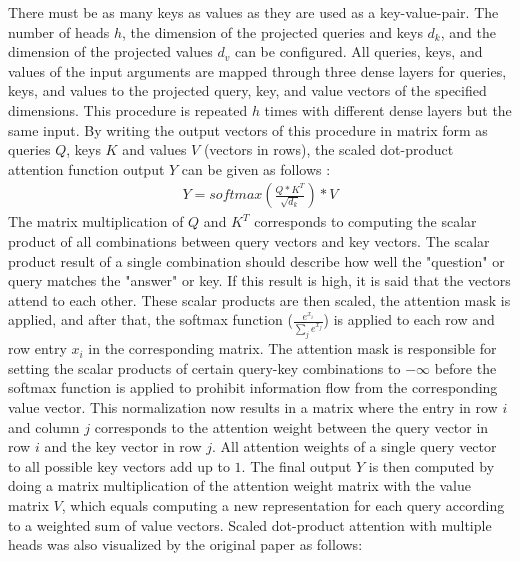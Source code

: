 \documentclass[draft,final]{vutinfth} %
\begin{document}
    There must be as many keys as values as they are used as a key-value-pair.
    The number of heads $h$, the dimension of the projected queries and keys $d_k$, and the dimension of the projected values $d_v$ can be configured.
    All queries, keys, and values of the input arguments are mapped through three dense layers for queries, keys, and values to the projected query, key, and value vectors of the specified dimensions.
    This procedure is repeated $h$ times with different dense layers but the same input.
    By writing the output vectors of this procedure in matrix form as queries $Q$, keys $K$ and values $V$ (vectors in rows), the scaled dot-product attention function output $Y$ can be given as follows \cite[p. 4]{Transformer}:
    \begin{align}
        \label{sdpa}
        Y = softmax \left( \frac{Q * K^T}{\sqrt{d_k}} \right) * V
    \end{align}
    The matrix multiplication of $Q$ and $K^T$ corresponds to computing the scalar product of all combinations between query vectors and key vectors.
    The scalar product result of a single combination should describe how well the "question" or query matches the "answer" or key.
    If this result is high, it is said that the vectors attend to each other.
    These scalar products are then scaled, the attention mask is applied, and after that, the softmax function ($\frac{e^{x_i}}{\sum_j{e^{x_j}}}$) is applied to each row and row entry $x_i$ in the corresponding matrix.
    The attention mask is responsible for setting the scalar products of certain query-key combinations to $-\infty$ before the softmax function is applied to prohibit information flow from the corresponding value vector.
    This normalization now results in a matrix where the entry in row $i$ and column $j$ corresponds to the attention weight between the query vector in row $i$ and the key vector in row $j$.
    All attention weights of a single query vector to all possible key vectors add up to $1$.
    The final output $Y$ is then computed by doing a matrix multiplication of the attention weight matrix with the value matrix $V$, which equals computing a new representation for each query according to a weighted sum of value vectors.
    Scaled dot-product attention with multiple heads was also visualized by the original paper as follows:
\end{document}
